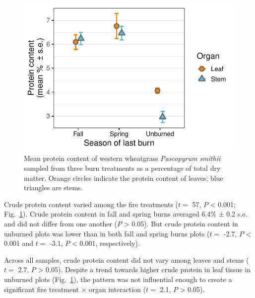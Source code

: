 \documentclass[referee, 
	            sn-basic]
           {sn-jnl}
\begin{document}
\begin{figure}
\centering
\includegraphics{value_gg-1.pdf}
\caption{Mean protein content of western wheatgrass \emph{Pascopyrum smithii} sampled from three burn treatments as a percentage of total dry matter. 
Orange circles indicate the protein content of leaves; blue triangles are stems.}
 \label{value} %
\end{figure}

Crude protein content varied among the fire treatments (\(t =\) 57, \(P\) \textless{} 0.001; Fig.~\ref{value}). 
Crude protein content in fall and spring burns averaged 6.4\% ± 0.2 s.e. and did not differ from one another (\(P\) \textgreater{} 0.05). 
But crude protein content in unburned  plots was lower than in both fall and spring burns plots (\(t =\) -2.7, \(P\) \textless{} 0.001 and \(t =\) -3.1, \(P\) \textless{} 0.001, respectively).

Across all samples, crude protein content did not vary among leaves and
stems (\(t =\) 2.7, \(P\) \textgreater{} 0.05). Despite a trend towards
higher crude protein in leaf tissue in unburned plots (Fig.~\ref{value}), the
pattern was not influential enough to create a significant fire
treatment \(\times\) organ interaction (\(t =\) 2.1, \(P\)
\textgreater{} 0.05).
\end{document}
